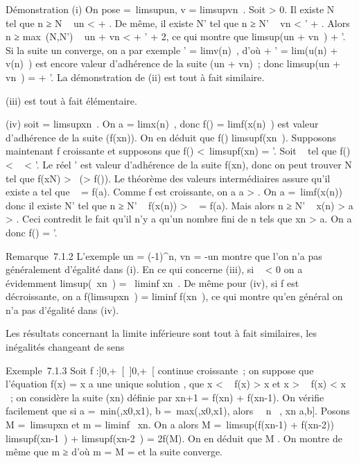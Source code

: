 Démonstration (i) On pose \ell =\
limsupun, v = limsupvn~.
Soit \epsilon \textgreater{} 0. Il existe N \in {}~ tel que n ≥ N \rigtharrow~ un
\textless{} \ell + \epsilon. De même, il existe N' tel que n ≥ N' \rigtharrow~ vn
\textless{} \ell' + \epsilon. Alors n ≥ max~(N,N') \rigtharrow~
un + vn \textless{} \ell + \ell' + 2\epsilon, ce qui montre que
limsup(un + vn~) \leq \ell + \ell'.
Si la suite un converge, on a par exemple \ell'
= limv\phi(n)~, d'où \ell + \ell'
= lim(u\phi(n) + v\phi(n)~) est
encore valeur d'adhérence de la suite (un + vn)~;
donc limsup(un + vn~) = \ell +
\ell'. La démonstration de (ii) est tout à fait similaire.

(iii) est tout à fait élémentaire.

(iv) soit \ell = limsupxn~. On a \ell
= limx\phi(n)~, donc f(\ell)
= limf(x\phi(n)~) est valeur d'adhérence
de la suite (f(xn)). On en déduit que f(\ell)
\leq limsupf(xn~). Supposons maintenant
f croissante et supposons que f(\ell) \textless{}\
limsupf(xn) = \ell'. Soit \alpha~ tel que f(\ell) \textless{} \alpha~
\textless{} \ell'. Le réel \ell' est valeur d'adhérence de la suite
f(xn), donc on peut trouver N tel que f(xN)
\textgreater{} \alpha~(\textgreater{} f(\ell)). Le théorème des valeurs
intermédiaires assure qu'il existe a tel que \alpha~ = f(a). Comme f est
croissante, on a a \textgreater{} \ell. On a \ell =\
limf(x\phi(n)) donc il existe N' tel que n ≥ N' \rigtharrow~
f(x\phi(n)) \textgreater{} \alpha~ = f(a). Mais alors n ≥ N' \rigtharrow~
x\phi(n) \textgreater{} a \textgreater{} \ell. Ceci contredit le
fait qu'il n'y a qu'un nombre fini de n tels que xn
\textgreater{} a. On a donc f(\ell) = \ell'.

Remarque~7.1.2 L'exemple un = (-1)^n, vn
= -un montre que l'on n'a pas généralement d'égalité dans (i).
En ce qui concerne (iii), si \lambda~ \textless{} 0 on a évidemment
limsup(\lambda~xn~) =
\lambda~liminf xn~. De même pour (iv), si f
est décroissante, on a f(limsupxn~)
= liminf f(xn~), ce qui montre qu'en
général on n'a pas d'égalité dans (iv).

Les résultats concernant la limite inférieure sont tout à fait
similaires, les inégalités changeant de sens

Exemple~7.1.3 Soit f :{]}0,+\infty~{[}\rightarrow~{]}0,+\infty~{[} continue croissante~; on
suppose que l'équation f(x) = x  a une unique
solution \ell, que x \textless{} \ell \rigtharrow~ f(x) \textgreater{} x
\over 2 et x \textgreater{} \ell \rigtharrow~ f(x) \textless{} x
\over 2 ~; on considère la suite (xn) définie
par xn+1 = f(xn) + f(xn-1). On vérifie
facilement que si a =\
min(\ell,x0,x1), b =\
max(\ell,x0,x1), alors \forall~~n \in
\mathbb{N}~, xn \in {[}a,b{]}. Posons M =\
limsupxn et m = liminf~
xn. On a alors M =\
limsup(f(xn-1) + f(xn-2))
\leq limsupf(xn-1~)
+ limsupf(xn-2~) = 2f(M). On en
déduit que M \leq \ell. On montre de même que m ≥ \ell d'où m = M = \ell et la suite
converge.

